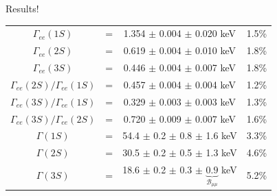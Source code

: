 \documentclass[landscape]{article}
\begin{document}
\begin{slide:conclusions}

\begin{center}
\begin{minipage}{0.9\linewidth}
Results!
\end{minipage}
\end{center}

\begin{center}
\renewcommand{\arraystretch}{1.8}
\begin{tabular}{c c c c}
  \boldmath $\Gamma_{ee}(1S)$ & \mbox{\hspace{0.25 cm}} = \mbox{\hspace{0.25 cm}} & 1.354 $\pm$ 0.004 $\pm$ 0.020 keV & \mbox{\hspace{0.5 cm}} 1.5\% \mbox{\hspace{0.5 cm}} \\
  \boldmath $\Gamma_{ee}(2S)$ & = & 0.619 $\pm$ 0.004 $\pm$ 0.010 keV & 1.8\% \\
  \boldmath $\Gamma_{ee}(3S)$ & = & 0.446 $\pm$ 0.004 $\pm$ 0.007 keV & 1.8\% \\\hline

  \boldmath $\Gamma_{ee}(2S)/\Gamma_{ee}(1S)$ & = & 0.457 $\pm$ 0.004 $\pm$ 0.004 keV & 1.2\% \\
  \boldmath $\Gamma_{ee}(3S)/\Gamma_{ee}(1S)$ & = & 0.329 $\pm$ 0.003 $\pm$ 0.003 keV & 1.3\% \\
  \boldmath $\Gamma_{ee}(3S)/\Gamma_{ee}(2S)$ & = & 0.720 $\pm$ 0.009 $\pm$ 0.007 keV & 1.6\% \\\hline

  \boldmath $\Gamma(1S)$ & = & 54.4 $\pm$ 0.2 $\pm$ 0.8 $\pm$ 1.6 keV & 3.3\% \\
  \boldmath $\Gamma(2S)$ & = & 30.5 $\pm$ 0.2 $\pm$ 0.5 $\pm$ 1.3 keV & 4.6\% \\
  \boldmath $\Gamma(3S)$ & = & 18.6 $\pm$ 0.2 $\pm$ 0.3 $\pm$ $\underbrace{\mbox{0.9}}_{{\mathcal B}_{\mu\mu}}$ keV & 5.2\% \\

\end{tabular}
\end{center}

\end{slide:conclusions}
\end{document}
